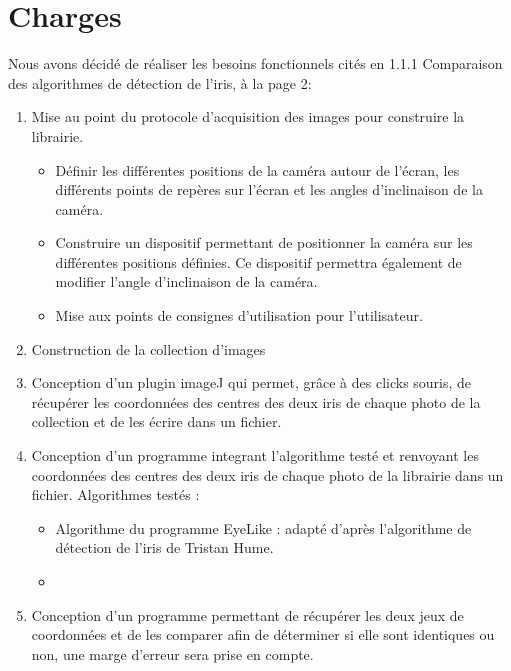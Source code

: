 \documentclass[a4paper, 12pt]{report}
\begin{document}
    \chapter{Charges}
Nous avons décidé de réaliser les besoins fonctionnels cités en 1.1.1 Comparaison des algorithmes de détection de l'iris, à la page 2:
\begin{enumerate}
\item Mise au point du protocole d'acquisition des images pour construire la librairie.
\begin{itemize}
\item Définir les différentes positions de la caméra autour de l'écran, les différents points de repères sur l'écran et les angles d'inclinaison de la caméra.
\item Construire un dispositif permettant de positionner la caméra sur les différentes positions définies. Ce dispositif permettra également de modifier l'angle d'inclinaison de la caméra.
\item Mise aux points de consignes d'utilisation pour l'utilisateur.
\end{itemize}
\item Construction de la collection d'images
\item Conception d'un plugin imageJ qui permet, grâce à des clicks souris, de récupérer les coordonnées des centres des deux iris de chaque photo de la collection et de les écrire dans un fichier.
\item Conception d'un programme integrant l'algorithme testé et renvoyant les coordonnées des centres des deux iris de chaque photo de la librairie dans un fichier.
Algorithmes testés :
\begin{itemize}
\item Algorithme du programme EyeLike : adapté d'après l'algorithme de détection de l'iris de Tristan Hume.
\item
\end{itemize}
\item Conception d'un programme permettant de récupérer les deux jeux de coordonnées et de les comparer afin de déterminer si elle sont identiques ou non, une marge d'erreur sera prise en compte.
\end{enumerate}
\end{document}
